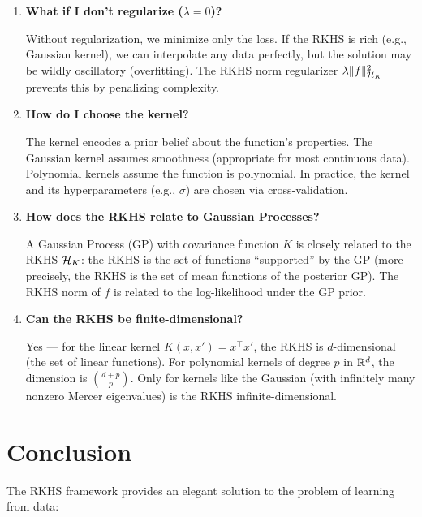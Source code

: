 \begin{notechapter}
\begin{enumerate}[label=\textbf{Q\arabic*.}, leftmargin=*, itemsep=10pt]
\item \textbf{What if I don't regularize ($\lambda = 0$)?}

Without regularization, we minimize only the loss. If the RKHS is rich
(e.g., Gaussian kernel), we can interpolate any data perfectly, but the
solution may be wildly oscillatory (overfitting). The RKHS norm
regularizer $\lambda\| f \|_{\mathcal{H}_K}^2$ prevents this by penalizing
complexity.

\item \textbf{How do I choose the kernel?}

The kernel encodes a prior belief about the function's properties. The
Gaussian kernel assumes smoothness (appropriate for most continuous
data). Polynomial kernels assume the function is polynomial. In
practice, the kernel and its hyperparameters (e.g., $\sigma$) are chosen
via cross-validation.

\item \textbf{How does the RKHS relate to Gaussian Processes?}

A Gaussian Process (GP) with covariance function $K$ is closely related
to the RKHS $\mathcal{H}_K$: the RKHS is the set of functions ``supported'' by the
GP (more precisely, the RKHS is the set of mean functions of the
posterior GP). The RKHS norm of $f$ is related to the log-likelihood
under the GP prior.

\item \textbf{Can the RKHS be finite-dimensional?}

Yes --- for the linear kernel $K(x,x') = x^\top x'$, the RKHS is
$d$-dimensional (the set of linear functions). For polynomial kernels of
degree $p$ in $\mathbb{R}^d$, the dimension is $\binom{d+p}{p}$. Only for
kernels like the Gaussian (with infinitely many nonzero Mercer
eigenvalues) is the RKHS infinite-dimensional.

\end{enumerate}

\section{Conclusion}
\label{rkhs:sec:conclusion}

The RKHS framework provides an elegant solution to the problem of
learning from data:


\end{notechapter}
